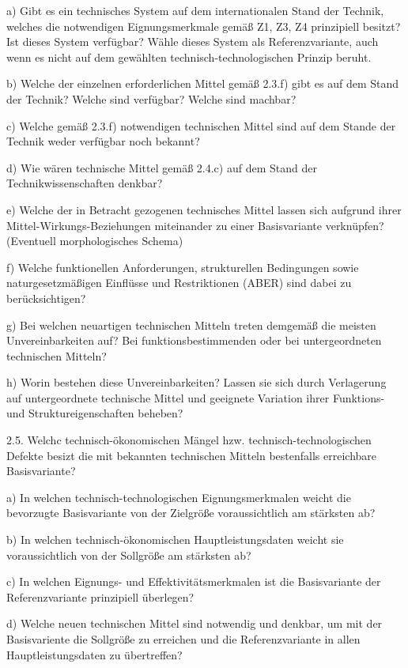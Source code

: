 \documentclass[11pt,a4paper]{article}
\begin{document}
a) Gibt es ein technisches System auf dem internationalen Stand der Technik,
welches die notwendigen Eignungsmerkmale gemäß Z1, Z3, Z4 prinzipiell besitzt?
Ist dieses System verfüg\-bar?  Wähle dieses System als Referenzvariante, auch
wenn es nicht auf dem gewählten technisch-technologischen Prinzip beruht.

b) Welche der einzelnen erforderlichen Mittel gemäß 2.3.f) gibt es auf dem
Stand der Technik? Welche sind verfügbar? Welche sind machbar?

c) Welche gemäß 2.3.f) notwendigen technischen Mittel sind auf dem Stande der
Technik weder verfügbar noch bekannt?

d) Wie wären technische Mittel gemäß 2.4.c) auf dem Stand der
Technikwissenschaften denkbar?

e) Welche der in Betracht gezogenen technisches Mittel lassen sich aufgrund
ihrer Mittel-Wirkungs-Beziehungen miteinander zu einer Basisvariante
verknüpfen? (Eventuell morphologisches Schema) 

f) Welche funktionellen Anforderungen, strukturellen Bedingungen sowie
naturgesetzmäßigen Einflüsse und Restriktionen (ABER) sind dabei zu
berücksichtigen?

g) Bei welchen neuartigen technischen Mitteln treten demgemäß die meisten
Unvereinbarkeiten auf? Bei funktionsbestimmenden oder bei untergeordneten
technischen Mitteln?

h) Worin bestehen diese Unvereinbarkeiten? Lassen sie sich durch Verlagerung
auf untergeordnete technische Mittel und geeignete Variation ihrer Funktions-
und Struktureigenschaften beheben?

2.5. Welchc technisch-ökonomischen Mängel hzw. technisch-technologischen
Defekte besizt die mit bekannten technischen Mitteln bestenfalls erreichbare
Basisvariante?

a) In welchen technisch-technologischen Eignungsmerkmalen weicht die
bevorzugte Basisvariante von der Zielgröße voraussichtlich am stärksten ab?

b) In welchen technisch-ökonomischen Hauptleistungsdaten weicht sie
voraussichtlich von der Sollgröße am stärksten ab?

c) In welchen Eignungs- und Effektivitätsmerkmalen ist die Basisvariante der
Referenzvariante prinzipiell überlegen?

d) Welche neuen technischen Mittel sind notwendig und denkbar, um mit der
Basisvariente die Sollgröße zu erreichen und die Referenzvariante in allen
Hauptleistungsdaten zu übertreffen?
\end{document}
